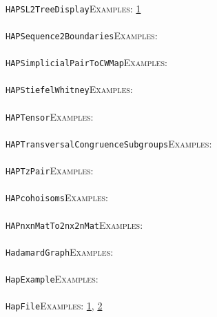 \documentclass[a4paper,11pt]{report}
\begin{document}
{{ \\
 \texttt{HAP{\textunderscore}SL2TreeDisplay}{\nobreakspace}{\nobreakspace}{\nobreakspace}{\nobreakspace}\textsc{Examples:} \href{tutorial/chap10.html} {1}{\nobreakspace} \\
 \\
 \texttt{HAP{\textunderscore}Sequence2Boundaries}{\nobreakspace}{\nobreakspace}{\nobreakspace}{\nobreakspace}\textsc{Examples:} \\
 \\
 \texttt{HAP{\textunderscore}SimplicialPairToCWMap}{\nobreakspace}{\nobreakspace}{\nobreakspace}{\nobreakspace}\textsc{Examples:} \\
 \\
 \texttt{HAP{\textunderscore}StiefelWhitney}{\nobreakspace}{\nobreakspace}{\nobreakspace}{\nobreakspace}\textsc{Examples:} \\
 \\
 \texttt{HAP{\textunderscore}Tensor}{\nobreakspace}{\nobreakspace}{\nobreakspace}{\nobreakspace}\textsc{Examples:} \\
 \\
 \texttt{HAP{\textunderscore}TransversalCongruenceSubgroups}{\nobreakspace}{\nobreakspace}{\nobreakspace}{\nobreakspace}\textsc{Examples:} \\
 \\
 \texttt{HAP{\textunderscore}TzPair}{\nobreakspace}{\nobreakspace}{\nobreakspace}{\nobreakspace}\textsc{Examples:} \\
 \\
 \texttt{HAP{\textunderscore}coho{\textunderscore}isoms}{\nobreakspace}{\nobreakspace}{\nobreakspace}{\nobreakspace}\textsc{Examples:} \\
 \\
 \texttt{HAP{\textunderscore}nxnMatTo2nx2nMat}{\nobreakspace}{\nobreakspace}{\nobreakspace}{\nobreakspace}\textsc{Examples:} \\
 \\
 \texttt{HadamardGraph}{\nobreakspace}{\nobreakspace}{\nobreakspace}{\nobreakspace}\textsc{Examples:} \\
 \\
 \texttt{HapExample}{\nobreakspace}{\nobreakspace}{\nobreakspace}{\nobreakspace}\textsc{Examples:} \\
 \\
 \texttt{HapFile}{\nobreakspace}{\nobreakspace}{\nobreakspace}{\nobreakspace}\textsc{Examples:} \href{tutorial/chap2.html} {1}{\nobreakspace}, \href{tutorial/chap4.html} {2}{\nobreakspace} \\
}}
\end{document}
